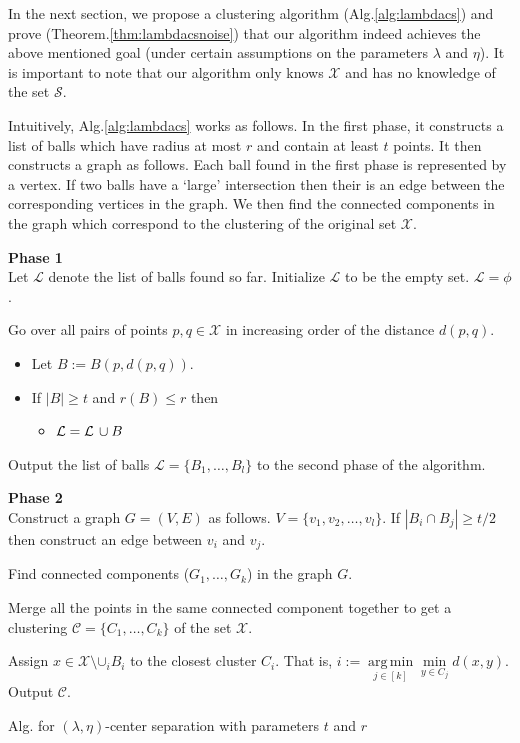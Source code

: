 \documentclass[orivec]{llncs}
\newcommand{\mc}{\mathcal}
\DeclareMathOperator*{\argmin}{arg\,min}
\renewcommand\labelitemi{$\bullet$}
\begin{document}
In the next section, we propose a clustering algorithm (Alg.\ref{alg:lambdacs}) and prove (Theorem.\ref{thm:lambdacsnoise}) that our algorithm indeed achieves the above mentioned goal (under certain assumptions on the parameters $\lambda$ and $\eta$). It is important to note that our algorithm only knows $\mc X$ and has no knowledge of the set $\mc S$. 

Intuitively, Alg.\ref{alg:lambdacs} works as follows. In the first phase, it constructs a list of balls which have radius at most $r$ and contain at least $t$ points. It then constructs a graph as follows. Each ball found in the first phase is represented by a vertex. If two balls have a `large' intersection then their is an edge between the corresponding vertices in the graph. We then find the connected components in the graph which correspond to the clustering of the original set $\mc X$. 


\begin{algorithm}[!ht]	
	\KwIn{$(\mc X, d), t$ and $r$}
	\KwOut{A clustering $\mc C$ of the set $\mc X$.}
	
	\vspace{0.1in}\textbf{Phase 1}\\
	Let $\mc L$ denote the list of balls found so far. Initialize $\mc L$ to be the empty set. $\mc L = \phi$.
	
	Go over all pairs of points $p, q \in \mc X$ in increasing order of the distance $d(p, q)$. 		\begin{itemize}[noitemsep, nolistsep]
	\renewcommand\labelitemi{}
	\item Let $B := B(p, d(p, q))$. 
	\item If $|B| \ge t$ and $r(B) \le r$ then
		\begin{itemize}[noitemsep, nolistsep]
		\renewcommand\labelitemii{}
		\item $\mc L = \mc L \thinspace\cup B$
		\end{itemize}
	\end{itemize}
	Output the list of balls $\mc L = \{B_1, \ldots, B_l\}$ to the second phase of the algorithm.
	
	\vspace{0.1in}\textbf{Phase 2}\\
	Construct a graph $G = (V, E)$ as follows. $V = \{v_1, v_2, \ldots, v_l\}$. If $|B_i \cap B_j| \ge t/2$ then construct an edge between $v_i$ and $v_j$.
	
	Find connected components ($G_1, \ldots, G_{k}$) in the graph $G$. 
	
	Merge all the points in the same connected component together to get a clustering $\mc C = \{C_1, \ldots, C_k\}$ of the set $\mc X$.
	
	Assign $x \in \mc X \setminus \mc \cup_i B_i$ to the closest cluster $C_i$. That is, $i := \argmin\limits_{j\in [k]} \min\limits_{y \in C_j}d(x, y)$. Output $\mc C$. 
\caption{Alg. for $(\lambda, \eta)$-center separation with parameters $t$ and $r$}
\label{alg:lambdacs}
\end{algorithm}
\end{document}
